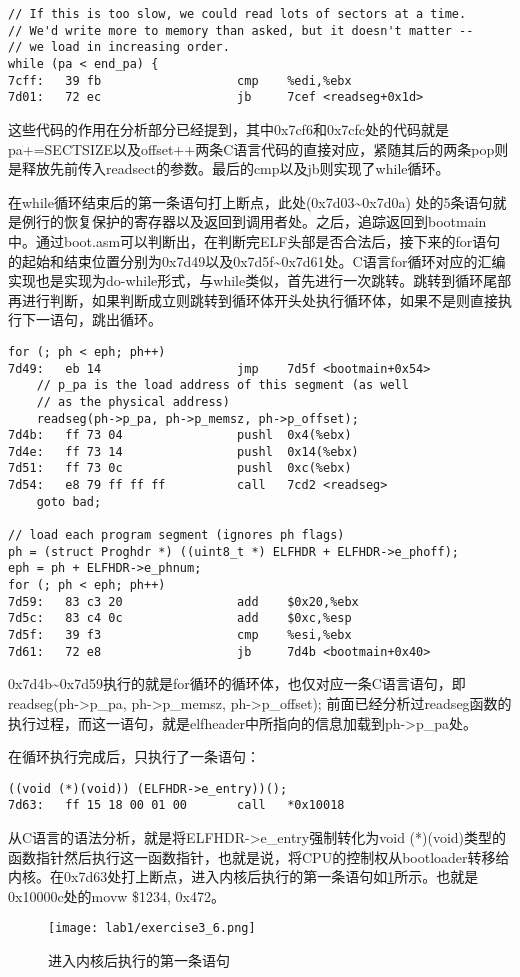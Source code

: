 \begin{exerciseSolution}{3}
\begin{lstlisting}
// If this is too slow, we could read lots of sectors at a time.
// We'd write more to memory than asked, but it doesn't matter --
// we load in increasing order.
while (pa < end_pa) {
7cff:	39 fb                	cmp    %edi,%ebx
7d01:	72 ec                	jb     7cef <readseg+0x1d>
\end{lstlisting}
\par 这些代码的作用在分析部分已经提到，其中0x7cf6和0x7cfc处的代码就是pa+=SECTSIZE以及offset++两条C语言代码的直接对应，紧随其后的两条pop则是释放先前传入readsect的参数。最后的cmp以及jb则实现了while循环。
\par 在while循环结束后的第一条语句打上断点，此处(0x7d03\textasciitilde 0x7d0a) 处的5条语句就是例行的恢复保护的寄存器以及返回到调用者处。之后，追踪返回到bootmain中。通过boot.asm可以判断出，在判断完ELF头部是否合法后，接下来的for语句的起始和结束位置分别为0x7d49以及0x7d5f\textasciitilde 0x7d61处。C语言for循环对应的汇编实现也是实现为do-while形式，与while类似，首先进行一次跳转。跳转到循环尾部再进行判断，如果判断成立则跳转到循环体开头处执行循环体，如果不是则直接执行下一语句，跳出循环。
\begin{lstlisting}
for (; ph < eph; ph++)
7d49:	eb 14                	jmp    7d5f <bootmain+0x54>
    // p_pa is the load address of this segment (as well
    // as the physical address)
    readseg(ph->p_pa, ph->p_memsz, ph->p_offset);
7d4b:	ff 73 04             	pushl  0x4(%ebx)
7d4e:	ff 73 14             	pushl  0x14(%ebx)
7d51:	ff 73 0c             	pushl  0xc(%ebx)
7d54:	e8 79 ff ff ff       	call   7cd2 <readseg>
    goto bad;

// load each program segment (ignores ph flags)
ph = (struct Proghdr *) ((uint8_t *) ELFHDR + ELFHDR->e_phoff);
eph = ph + ELFHDR->e_phnum;
for (; ph < eph; ph++)
7d59:	83 c3 20             	add    $0x20,%ebx
7d5c:	83 c4 0c             	add    $0xc,%esp
7d5f:	39 f3                	cmp    %esi,%ebx
7d61:	72 e8                	jb     7d4b <bootmain+0x40>
\end{lstlisting}
\par 0x7d4b\textasciitilde 0x7d59执行的就是for循环的循环体，也仅对应一条C语言语句，即readseg(ph->p\_pa, ph->p\_memsz, ph->p\_offset); 前面已经分析过readseg函数的执行过程，而这一语句，就是elfheader中所指向的信息加载到ph->p\_pa处。
\par 在循环执行完成后，只执行了一条语句：
\begin{lstlisting}
((void (*)(void)) (ELFHDR->e_entry))();
7d63:	ff 15 18 00 01 00    	call   *0x10018
\end{lstlisting}
\par 从C语言的语法分析，就是将ELFHDR->e\_entry强制转化为void (*)(void)类型的函数指针然后执行这一函数指针，也就是说，将CPU的控制权从bootloader转移给内核。在0x7d63处打上断点，进入内核后执行的第一条语句如\ref{fig:exercise3_6}所示。也就是0x10000c处的movw \$1234, 0x472。
\begin{figure}[htb]
    \centering
    \texttt{[image: lab1/exercise3\_6.png]}
    \caption{进入内核后执行的第一条语句}
    \label{fig:exercise3_6}
\end{figure}
\end{exerciseSolution}

